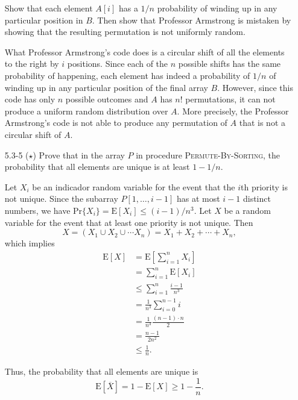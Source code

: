 \begin{enumerate}
{Show that each element $A[i]$ has a $1/n$ probability of winding up in any
particular position in $B$. Then show that Professor Armstrong is mistaken by
showing that the resulting permutation is not uniformly random.
}

\begin{framed}
What Professor Armstrong's code does is a circular shift of all the elements to
the right by $i$ positions. Since each of the $n$ possible shifts has the same
probability of happening, each element has indeed a probability of $1/n$ of
winding up in any particular position of the final array $B$. However, since
this code has only $n$ possible outcomes and $A$ has $n!$ permutations, it can
not produce a uniform random distribution over $A$. More precisely, the
Professor Armstrong's code is not able to produce any permutation of $A$ that
is not a circular shift of $A$.
\end{framed}

\item[5.3{-}5]{($\star$) Prove that in the array $P$ in procedure
\textsc{Permute-By-Sorting}, the probability that all elements are unique is at
least $1 - 1/n$.}

\begin{framed}
Let $X_i$ be an indicador random variable for the event that the $i$th priority
is not unique. Since the subarray $P[1, \dots, i - 1]$ has at most $i - 1$
distinct numbers, we have $\text{Pr}\{X_i\} = \text{E}[X_i] \le (i - 1)/n^3$.
Let $X$ be a random variable for the event that at least one priority is not
unique. Then
\[
  X = (X_1 \cup X_2 \cup \cdots X_n) = X_1 + X_2 + \cdots + X_n,
\]
which implies
\begin{equation*}
\begin{aligned}
  \text{E}[X] &=   \text{E}\left[\sum_{i = 1}^{n} X_i\right]\\
              &=   \sum_{i = 1}^{n} \text{E}[X_i]\\
              &\le \sum_{i = 1}^{n} \frac{i - 1}{n^3}\\
              &=   \frac{1}{n^3} \sum_{i = 0}^{n - 1} i\\
              &=   \frac{1}{n^3} \frac{(n - 1) \cdot n}{2}\\
              &=   \frac{n - 1}{2 n^2}\\
              &\le \frac{1}{n}.
\end{aligned}
\end{equation*}

Thus, the probability that all elements are unique is
\[
  \text{E}[\overline{X}] = 1 - \text{E}[X] \ge 1 - \frac{1}{n}.
\]
\end{framed}


\end{enumerate}
